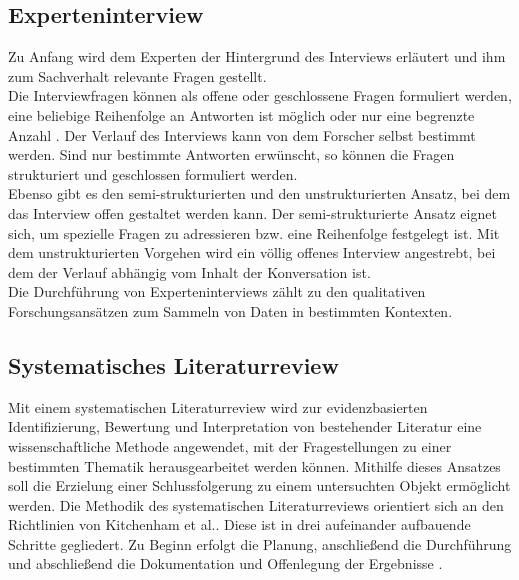     \subsection{Experteninterview}
    \label{subsec:experteninterview}
        Zu Anfang wird dem Experten der Hintergrund des Interviews erläutert und ihm zum Sachverhalt relevante Fragen gestellt. 
        \\
        \linebreak
        Die Interviewfragen können als offene oder geschlossene Fragen formuliert werden, eine beliebige Reihenfolge an Antworten ist 
        möglich oder nur eine begrenzte Anzahl \cite{robson2002real}. Der Verlauf des Interviews 
        kann von dem Forscher selbst bestimmt werden. Sind nur bestimmte Antworten erwünscht, so können die Fragen strukturiert und 
        geschlossen formuliert werden. 
        \\
        Ebenso gibt es den semi-strukturierten und den unstrukturierten Ansatz, bei dem das Interview 
        offen gestaltet werden kann. Der semi-strukturierte Ansatz eignet sich, um spezielle Fragen zu adressieren bzw. eine 
        Reihenfolge festgelegt ist. Mit dem unstrukturierten Vorgehen wird 
        ein völlig offenes Interview angestrebt, bei dem der Verlauf abhängig vom Inhalt der Konversation ist.
        \\
        Die Durchführung von Experteninterviews zählt zu den qualitativen Forschungsansätzen zum Sammeln von Daten in bestimmten Kontexten. 

    \subsection{Systematisches Literaturreview}
    \label{subsec:systematischesliteraturreview}
        Mit einem systematischen Literaturreview wird zur evidenzbasierten Identifizierung, Bewertung und Interpretation  
        von bestehender Literatur eine wissenschaftliche Methode angewendet, mit der Fragestellungen zu einer bestimmten Thematik 
        herausgearbeitet werden können. Mithilfe dieses Ansatzes soll die Erzielung einer Schlussfolgerung zu einem untersuchten Objekt 
        ermöglicht werden. 
        Die Methodik des systematischen Literaturreviews orientiert sich an den Richtlinien von Kitchenham et al.. Diese ist in drei 
        aufeinander aufbauende Schritte gegliedert. Zu Beginn erfolgt die Planung, anschließend die Durchführung und abschließend die 
        Dokumentation und Offenlegung der Ergebnisse \cite{Kitchenham2007}.

